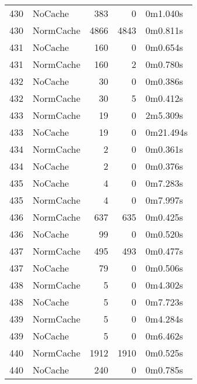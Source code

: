 \begin{tabular}{llrrl}
430 & NoCache & 383 & 0 & 0m1.040s \\
430 & NormCache & 4866 & 4843 & 0m0.811s \\
431 & NoCache & 160 & 0 & 0m0.654s \\
431 & NormCache & 160 & 2 & 0m0.780s \\
432 & NoCache & 30 & 0 & 0m0.386s \\
432 & NormCache & 30 & 5 & 0m0.412s \\
433 & NormCache & 19 & 0 & 2m5.309s \\
433 & NoCache & 19 & 0 & 0m21.494s \\
434 & NormCache & 2 & 0 & 0m0.361s \\
434 & NoCache & 2 & 0 & 0m0.376s \\
435 & NoCache & 4 & 0 & 0m7.283s \\
435 & NormCache & 4 & 0 & 0m7.997s \\
436 & NormCache & 637 & 635 & 0m0.425s \\
436 & NoCache & 99 & 0 & 0m0.520s \\
437 & NormCache & 495 & 493 & 0m0.477s \\
437 & NoCache & 79 & 0 & 0m0.506s \\
438 & NormCache & 5 & 0 & 0m4.302s \\
438 & NoCache & 5 & 0 & 0m7.723s \\
439 & NormCache & 5 & 0 & 0m4.284s \\
439 & NoCache & 5 & 0 & 0m6.462s \\
440 & NormCache & 1912 & 1910 & 0m0.525s \\
440 & NoCache & 240 & 0 & 0m0.785s \\
\bottomrule
\end{tabular}
